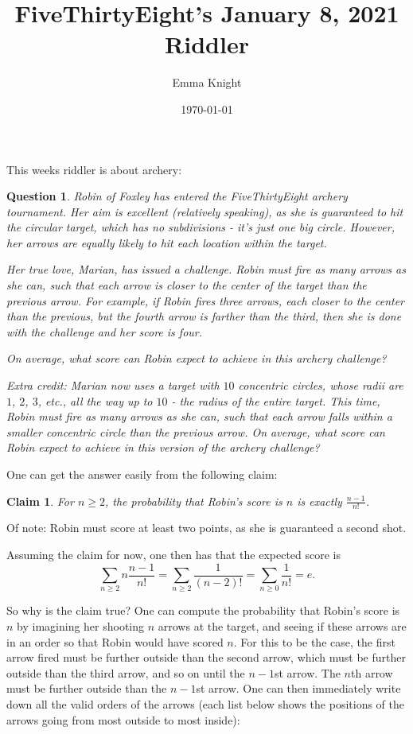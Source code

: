 \documentclass[11pt]{article}
\title{FiveThirtyEight's January 8, 2021 Riddler}
\author{Emma Knight}
\date{\today}
\newtheorem{claim}[theorem]{Claim}
\newtheorem{question}[theorem]{Question}
\theoremstyle{definition}
\begin{document}
\maketitle
This weeks riddler is about archery:
\begin{question}
Robin of Foxley has entered the FiveThirtyEight archery tournament. Her aim is excellent (relatively speaking), as she is guaranteed to hit the circular target, which has no subdivisions - it's just one big circle. However, her arrows are equally likely to hit each location within the target.

Her true love, Marian, has issued a challenge. Robin must fire as many arrows as she can, such that each arrow is closer to the center of the target than the previous arrow. For example, if Robin fires three arrows, each closer to the center than the previous, but the fourth arrow is farther than the third, then she is done with the challenge and her score is four.

On average, what score can Robin expect to achieve in this archery challenge?

\emph{Extra credit}: Marian now uses a target with $10$ concentric circles, whose radii are $1$, $2$, $3$, etc., all the way up to $10$ - the radius of the entire target. This time, Robin must fire as many arrows as she can, such that each arrow falls within a smaller concentric circle than the previous arrow. On average, what score can Robin expect to achieve in this version of the archery challenge?
\end{question}
One can get the answer easily from the following claim:
\begin{claim}
For $n \geq 2$, the probability that Robin's score is $n$ is exactly $\displaystyle{\frac{n-1}{n!}}$.
\end{claim}
Of note: Robin must score at least two points, as she is guaranteed a second shot.

Assuming the claim for now, one then has that the expected score is $$\sum_{n \geq 2} n\frac{n-1}{n!} = \sum_{n \geq 2} \frac{1}{(n-2)!} = \sum_{n \geq 0} \frac{1}{n!} = e.$$

So why is the claim true?  One can compute the probability that Robin's score is $n$ by imagining her shooting $n$ arrows at the target, and seeing if these arrows are in an order so that Robin would have scored $n$.  For this to be the case, the first arrow fired must be further outside than the second arrow, which must be further outside than the third arrow, and so on until the $n-1$st arrow.  The $n$th arrow must be further outside than the $n-1$st arrow.  One can then immediately write down all the valid orders of the arrows (each list below shows the positions of the arrows going from most outside to most inside):
\end{document}
